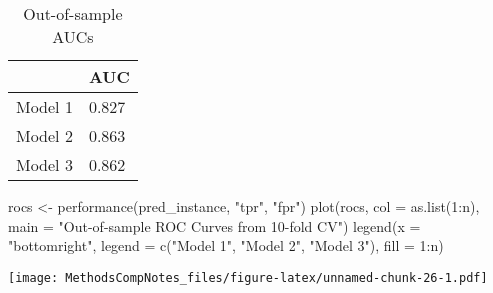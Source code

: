 \documentclass[
]{article}
\newenvironment{Shaded}{\begin{snugshade}}{\end{snugshade}}
\newcommand{\AttributeTok}[1]{\textcolor[rgb]{0.77,0.63,0.00}{#1}}
\newcommand{\DecValTok}[1]{\textcolor[rgb]{0.00,0.00,0.81}{#1}}
\newcommand{\FunctionTok}[1]{\textcolor[rgb]{0.00,0.00,0.00}{#1}}
\newcommand{\NormalTok}[1]{#1}
\newcommand{\OtherTok}[1]{\textcolor[rgb]{0.56,0.35,0.01}{#1}}
\newcommand{\SpecialCharTok}[1]{\textcolor[rgb]{0.00,0.00,0.00}{#1}}
\newcommand{\StringTok}[1]{\textcolor[rgb]{0.31,0.60,0.02}{#1}}
\begin{document}
\begin{table}

\caption{\label{tab:unnamed-chunk-26}Out-of-sample AUCs}
\centering
\begin{tabular}[t]{l|l}
\hline
 & AUC\\
\hline
Model 1 & 0.827\\
\hline
Model 2 & 0.863\\
\hline
Model 3 & 0.862\\
\hline
\end{tabular}
\end{table}

\begin{Shaded}
\begin{Highlighting}[]
\NormalTok{rocs }\OtherTok{\textless{}{-}} \FunctionTok{performance}\NormalTok{(pred\_instance, }\StringTok{"tpr"}\NormalTok{, }\StringTok{"fpr"}\NormalTok{)}
\FunctionTok{plot}\NormalTok{(rocs, }\AttributeTok{col =} \FunctionTok{as.list}\NormalTok{(}\DecValTok{1}\SpecialCharTok{:}\NormalTok{n), }\AttributeTok{main =} \StringTok{"Out{-}of{-}sample ROC Curves from 10{-}fold CV"}\NormalTok{)}
\FunctionTok{legend}\NormalTok{(}\AttributeTok{x =} \StringTok{"bottomright"}\NormalTok{, }\AttributeTok{legend =} \FunctionTok{c}\NormalTok{(}\StringTok{"Model 1"}\NormalTok{, }\StringTok{"Model 2"}\NormalTok{, }\StringTok{"Model 3"}\NormalTok{),}
       \AttributeTok{fill =} \DecValTok{1}\SpecialCharTok{:}\NormalTok{n)}
\end{Highlighting}
\end{Shaded}

\texttt{[image: MethodsCompNotes\_files/figure-latex/unnamed-chunk-26-1.pdf]}

\begin{Shaded}
\end{Shaded}
\end{document}
